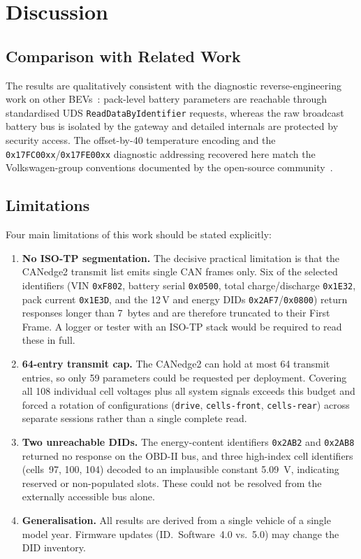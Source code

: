 \documentclass[11pt,a4paper,oneside,parskip=half]{scrreprt}
\providecommand{\hex}{}\renewcommand{\hex}[1]{\texttt{0x#1}}
\begin{document}
\chapter{Discussion}
\section{Comparison with Related Work}
The results are qualitatively consistent with the diagnostic reverse-engineering work on other BEVs~\cite{huybrechts2018reverse,pfeffer2022candid}: pack-level battery parameters are reachable through standardised UDS \texttt{ReadDataByIdentifier} requests, whereas the raw broadcast battery bus is isolated by the gateway and detailed internals are protected by security access. The offset-by-40 temperature encoding and the \hex{17FC00xx}/\hex{17FE00xx} diagnostic addressing recovered here match the Volkswagen-group conventions documented by the open-source community~\cite{opendbc}.

\section{Limitations}
Four main limitations of this work should be stated explicitly:

\begin{enumerate}
  \item \textbf{No ISO-TP segmentation.} The decisive practical limitation is that the CANedge2 transmit list emits single CAN frames only. Six of the selected identifiers (VIN \hex{F802}, battery serial \hex{0500}, total charge/discharge \hex{1E32}, pack current \hex{1E3D}, and the 12\,V and energy DIDs \hex{2AF7}/\hex{0800}) return responses longer than 7~bytes and are therefore truncated to their First Frame. A logger or tester with an ISO-TP stack would be required to read these in full.
  \item \textbf{64-entry transmit cap.} The CANedge2 can hold at most 64 transmit entries, so only 59 parameters could be requested per deployment. Covering all 108 individual cell voltages plus all system signals exceeds this budget and forced a rotation of configurations (\texttt{drive}, \texttt{cells-front}, \texttt{cells-rear}) across separate sessions rather than a single complete read.
  \item \textbf{Two unreachable DIDs.} The energy-content identifiers \hex{2AB2} and \hex{2AB8} returned no response on the OBD-II bus, and three high-index cell identifiers (cells~97, 100, 104) decoded to an implausible constant 5.09~V, indicating reserved or non-populated slots. These could not be resolved from the externally accessible bus alone.
  \item \textbf{Generalisation.} All results are derived from a single vehicle of a single model year. Firmware updates (ID.~Software~4.0 vs.\ 5.0) may change the DID inventory.
\end{enumerate}
\end{document}
